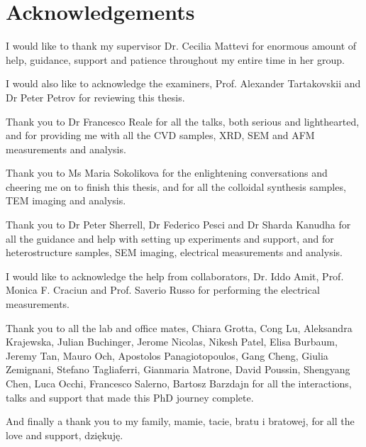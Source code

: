 \section*{Acknowledgements}

I would like to thank my supervisor Dr. Cecilia Mattevi for enormous amount of help, guidance, support and patience throughout my entire time in her group. 

I would also like to acknowledge the examiners, Prof. Alexander Tartakovskii and Dr Peter Petrov for reviewing this thesis.

Thank you to Dr Francesco Reale for all the talks, both serious and lighthearted, and for providing me with all the CVD samples, XRD, SEM and AFM measurements and analysis.

Thank you to Ms Maria Sokolikova for the enlightening conversations and cheering me on to finish this thesis, and for all the colloidal synthesis samples, TEM imaging and analysis.

Thank you to Dr Peter Sherrell, Dr Federico Pesci and Dr Sharda Kanudha for all the guidance and help with setting up experiments and support, and for heterostructure samples, SEM imaging, electrical measurements and analysis.

I would like to acknowledge the help from collaborators, Dr. Iddo Amit, Prof. Monica F. Craciun and Prof. Saverio Russo for performing the electrical measurements.

Thank you to all the lab and office mates, Chiara Grotta, Cong Lu, Aleksandra Krajewska, Julian Buchinger, Jerome Nicolas, Nikesh Patel, Elisa Burbaum, Jeremy Tan, Mauro Och, Apostolos Panagiotopoulos, Gang Cheng, Giulia Zemignani, Stefano Tagliaferri, Gianmaria Matrone, David Poussin, Shengyang Chen, Luca Occhi, Francesco Salerno, Bartosz Barzdajn for all the interactions, talks and support that made this PhD journey complete.

And finally a thank you to my family, mamie, tacie, bratu i bratowej, for all the love and support, dzi\k{e}kuj\k{e}.